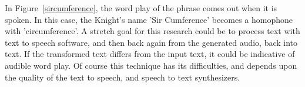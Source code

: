 In Figure~\ref{sircumference}, the word play of the phrase comes out when it is spoken. In this case, the Knight's name 'Sir Cumference' becomes a homophone with 'circumference'.
A stretch goal for this research could be to process text with text to speech software, and then back again from the generated audio, back into text. If the transformed text
differs from the input text, it could be indicative of audible word play. Of course this technique has its difficulties, and depends upon the quality of the text to speech, and speech to text synthesizers.


